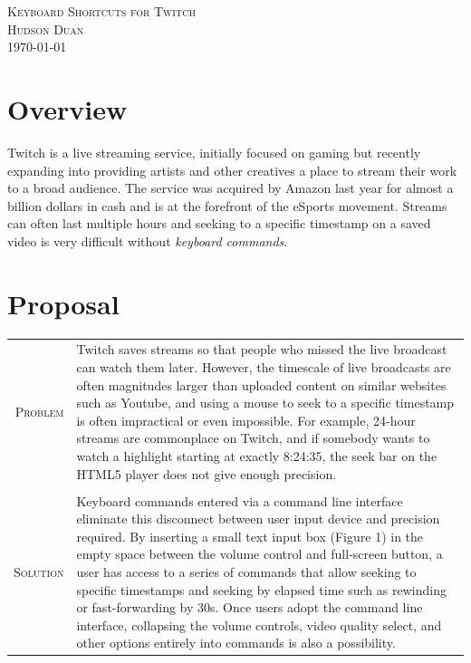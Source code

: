 \documentclass[11pt, letterpaper, UTF-8]{article}
\title{}
\author{}
\date{\textsc{\today}}
\begin{document}
\begin{center}
{\huge \textsc{Keyboard Shortcuts for Twitch}}
\bigskip\\
{\Large \textsc{Hudson Duan}}\\
\today\\
\end{center}
\section{Overview}
Twitch is a live streaming service, initially focused on gaming but recently expanding into providing artists and other creatives a place to stream their work to a broad audience. The service was acquired by Amazon last year for almost a billion dollars in cash and is at the forefront of the eSports movement. Streams can often last multiple hours and seeking to a specific timestamp on a saved video is very difficult without \textit{keyboard commands}.

\section{Proposal}

\indent\begin{tabular}{r|p{14cm}}

\textsc{Problem} & Twitch saves streams so that people who missed the live broadcast can watch them later. However, the timescale of live broadcasts are often magnitudes larger than uploaded content on similar websites such as Youtube, and using a mouse to seek to a specific timestamp is often impractical or even impossible. For example, 24-hour streams are commonplace on Twitch, and if somebody wants to watch a highlight starting at exactly 8:24:35, the seek bar on the HTML5 player does not give enough precision.\\
\\
\textsc{Solution} & Keyboard commands entered via a command line interface eliminate this disconnect between user input device and precision required. By inserting a small text input box (Figure 1) in the empty space between the volume control and full-screen button, a user has access to a series of commands that allow seeking to specific timestamps and seeking by elapsed time such as rewinding or fast-forwarding by 30s. Once users adopt the command line interface, collapsing the volume controls, video quality select, and other options entirely into commands is also a possibility.\\

\end{tabular}
\end{document}
